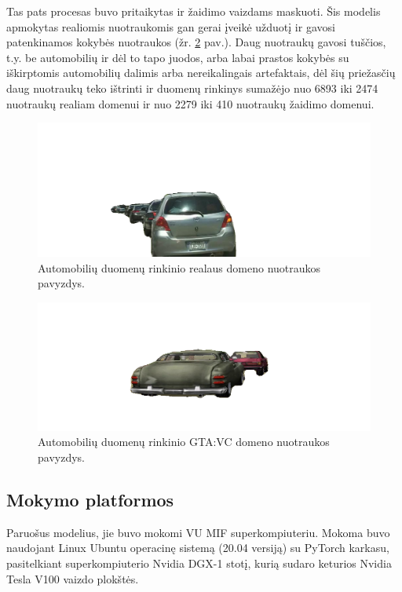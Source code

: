 \documentclass{VUMIFPSbakalaurinis}
\begin{document}
            Tas pats procesas buvo pritaikytas ir žaidimo vaizdams maskuoti. Šis modelis apmokytas realiomis nuotraukomis gan gerai įveikė užduotį ir gavosi patenkinamos kokybės nuotraukos (žr. \ref{img:vice_masked} pav.). Daug nuotraukų gavosi tuščios, t.y. be automobilių ir dėl to tapo juodos, arba labai prastos kokybės su iškirptomis automobilių dalimis arba nereikalingais artefaktais, dėl šių priežasčių daug nuotraukų teko ištrinti ir duomenų rinkinys sumažėjo nuo 6893 iki 2474 nuotraukų realiam domenui ir nuo 2279 iki 410 nuotraukų žaidimo domenui.

            \begin{figure}[H]
                \centering
                \includegraphics[scale=0.65]{img/segmentation/real_pvz}
                \caption{Automobilių duomenų rinkinio realaus domeno nuotraukos pavyzdys.}
                \label{img:real_masked}
            \end{figure}

            \begin{figure}[H]
                \centering
                \includegraphics[scale=0.75]{img/segmentation/vc_pvz}
                \caption{Automobilių duomenų rinkinio GTA:VC domeno nuotraukos pavyzdys.}
                \label{img:vice_masked}
            \end{figure}
            
    \subsection{Mokymo platformos}
        Paruošus modelius, jie buvo mokomi VU MIF superkompiuteriu. Mokoma buvo naudojant Linux Ubuntu operacinę sistemą (20.04 versiją) su PyTorch karkasu, pasitelkiant superkompiuterio Nvidia DGX-1 stotį, kurią sudaro keturios Nvidia Tesla V100 vaizdo plokštės.
\end{document}
